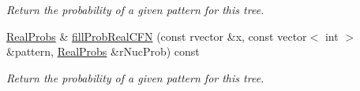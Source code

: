 \begin{DoxyCompactItemize}
\begin{DoxyCompactList}\small\item\em \-Return the probability of a given pattern for this tree. \end{DoxyCompactList}\item 
\hyperlink{PhyloTree_8hpp_a9a6f7e127d1279875ce95b0b6a331114}{\-Real\-Probs} \& \hyperlink{classPhyloTree_a29c5f4195d70604d82ac900a97e05d1a}{fill\-Prob\-Real\-C\-F\-N} (const rvector \&x, const vector$<$ int $>$ \&pattern, \hyperlink{PhyloTree_8hpp_a9a6f7e127d1279875ce95b0b6a331114}{\-Real\-Probs} \&r\-Nuc\-Prob) const 
\begin{DoxyCompactList}\small\item\em \-Return the probability of a given pattern for this tree. \end{DoxyCompactList}\end{DoxyCompactItemize}
